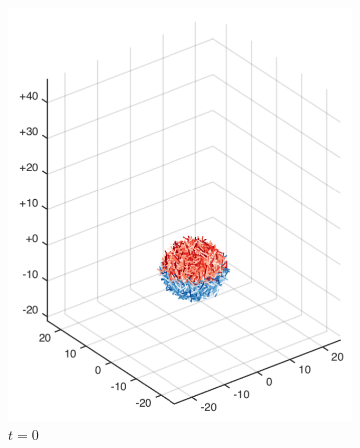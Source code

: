 \begin{figure}[!htbp]
  \centering
  \begin{subfigure}[h]{0.24\textwidth}
    \centering
    \includegraphics[width=\textwidth]{img/mixing/top_00000.pdf}
    \caption{$t=0$}\label{fig:mixing_top_a}
  \end{subfigure}
  \begin{subfigure}[h]{0.24\textwidth}
    \centering

\end{subfigure}
\end{figure}
